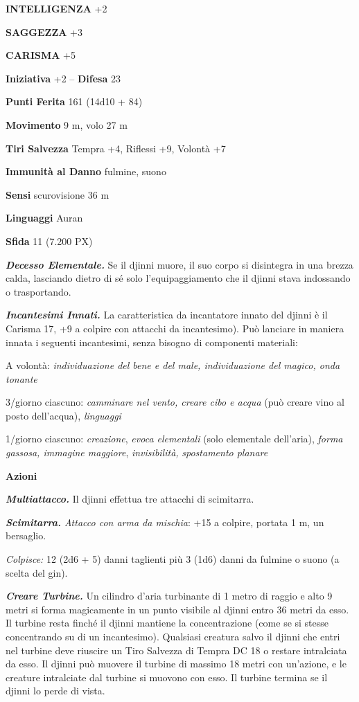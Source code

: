 \begin{multicols}{2}
\textbf{INTELLIGENZA} +2

\textbf{SAGGEZZA} +3

\textbf{CARISMA} +5

\textbf{Iniziativa} +2 -- \textbf{Difesa} 23

\textbf{Punti Ferita} 161 (14d10 + 84)

\textbf{Movimento} 9 m, volo 27 m

\textbf{Tiri Salvezza} Tempra +4, Riflessi +9, Volontà +7

\textbf{Immunità al Danno} fulmine, suono

\textbf{Sensi} scurovisione 36 m

\textbf{Linguaggi} Auran

\textbf{Sfida} 11 (7.200 PX)

\textit{\textbf{Decesso Elementale.}} Se il djinni muore, il suo corpo si disintegra in una brezza calda, lasciando dietro di sé solo l'equipaggiamento che il djinni stava indossando o trasportando.

\textit{\textbf{Incantesimi Innati.}} La caratteristica da incantatore innato del djinni è il Carisma 17, +9 a colpire con attacchi da incantesimo). Può lanciare in maniera innata i seguenti incantesimi, senza bisogno di componenti materiali:

A volontà: \textit{individuazione del bene e del male, individuazione del magico, onda tonante}

3/giorno ciascuno: \textit{camminare nel vento, creare cibo e acqua} (può creare vino al posto dell'acqua), \textit{linguaggi}

1/giorno ciascuno: \textit{creazione}, \textit{evoca elementali} (solo elementale dell'aria), \textit{forma gassosa, immagine maggiore}, \textit{invisibilità,} \textit{spostamento planare}

\textbf{Azioni}

\textit{\textbf{Multiattacco.}} Il djinni effettua tre attacchi di
scimitarra.

\textit{\textbf{Scimitarra.} Attacco con arma da mischia}: +15 a colpire, portata 1 m, un bersaglio.

\textit{Colpisce:} 12 (2d6 + 5) danni taglienti più 3 (1d6) danni da fulmine o suono (a scelta del gin).

\textit{\textbf{Creare Turbine.}} Un cilindro d'aria turbinante di 1 metro di raggio e alto 9 metri si forma magicamente in un punto visibile al djinni entro 36 metri da esso. Il turbine resta finché il djinni mantiene la concentrazione (come se si stesse concentrando su di un incantesimo). Qualsiasi creatura salvo il djinni che entri nel turbine deve riuscire un Tiro Salvezza di Tempra DC 18 o restare intralciata da esso. Il djinni può muovere il turbine di massimo 18 metri con un'azione, e le creature intralciate dal turbine si muovono con esso. Il turbine termina se il djinni lo perde di vista.


\end{multicols}

